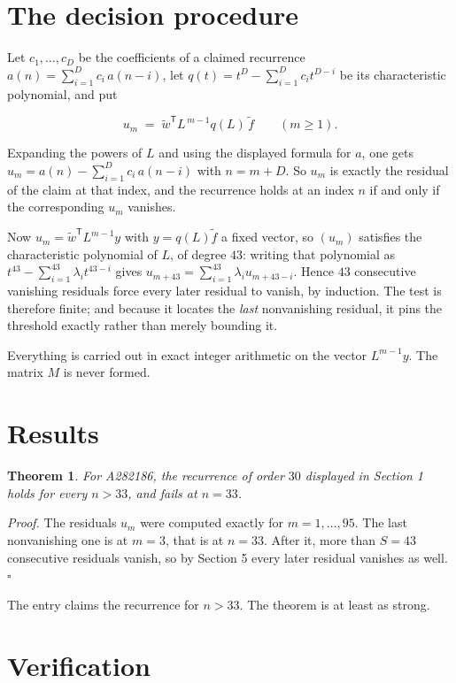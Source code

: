\documentclass[11pt]{article}
\newtheorem{theorem}{Theorem}
\theoremstyle{definition}
\begin{document}
\section{The decision procedure}

Let $c_1,\dots,c_D$ be the coefficients of a claimed recurrence $a(n) = \sum_{i=1}^{D} c_i\,a(n-i)$, let $q(t) = t^{D} - \sum_{i=1}^{D} c_i t^{D-i}$ be its characteristic polynomial, and put

\[u_m \;=\; \tilde w^{\mathsf T} L^{\,m-1} q(L)\,\tilde f \qquad (m \ge 1).\]

Expanding the powers of $L$ and using the displayed formula for $a$, one gets $u_m = a(n) - \sum_{i=1}^{D} c_i\,a(n-i)$ with $n = m + D$. So $u_m$ is exactly the residual of the claim at that index, and the recurrence holds at an index $n$ if and only if the corresponding $u_m$ vanishes.

Now $u_m = \tilde w^{\mathsf T} L^{m-1} y$ with $y = q(L)\tilde f$ a fixed vector, so $(u_m)$ satisfies the characteristic polynomial of $L$, of degree $43$: writing that polynomial as $t^{43} - \sum_{i=1}^{43} \lambda_i t^{43-i}$ gives $u_{m+43} = \sum_{i=1}^{43} \lambda_i u_{m+43-i}$. Hence $43$ consecutive vanishing residuals force every later residual to vanish, by induction. The test is therefore finite; and because it locates the {\itshape last} nonvanishing residual, it pins the threshold exactly rather than merely bounding it.

Everything is carried out in exact integer arithmetic on the vector $L^{m-1}y$. The matrix $M$ is never formed.

\section{Results}

\begin{theorem} For A282186, the recurrence of order $30$ displayed in Section 1 holds for every $n > 33$, and fails at $n = 33$.\end{theorem}

{\itshape Proof.} The residuals $u_m$ were computed exactly for $m = 1,\dots,95$. The last nonvanishing one is at $m = 3$, that is at $n = 33$. After it, more than $S = 43$ consecutive residuals vanish, so by Section 5 every later residual vanishes as well. $\square$

The entry claims the recurrence for $n > 33$. The theorem is at least as strong.

\section{Verification}
\end{document}
